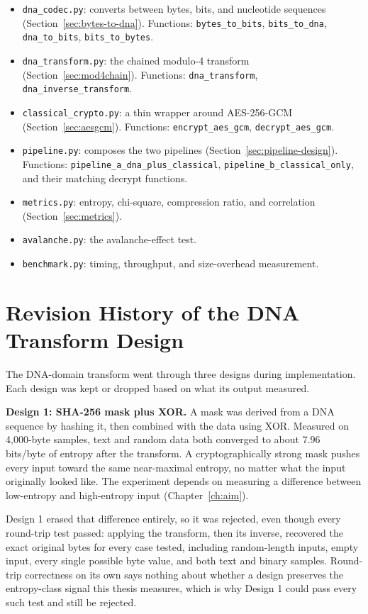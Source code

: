 \documentclass[12pt,a4paper,twoside]{report}
\numberwithin{equation}{chapter}
\begin{document}
\begin{itemize}
\item \texttt{dna\_codec.py}: converts between bytes, bits, and
nucleotide sequences (Section~\ref{sec:bytes-to-dna}). Functions:
\texttt{bytes\_to\_bits}, \texttt{bits\_to\_dna}, \texttt{dna\_to\_bits},
\texttt{bits\_to\_bytes}.
\item \texttt{dna\_transform.py}: the chained modulo-4 transform
(Section~\ref{sec:mod4chain}). Functions: \texttt{dna\_transform},
\texttt{dna\_inverse\_transform}.
\item \texttt{classical\_crypto.py}: a thin wrapper around AES-256-GCM
(Section~\ref{sec:aesgcm}). Functions: \texttt{encrypt\_aes\_gcm},
\texttt{decrypt\_aes\_gcm}.
\item \texttt{pipeline.py}: composes the two pipelines
(Section~\ref{sec:pipeline-design}). Functions:
\texttt{pipeline\_a\_dna\_\allowbreak plus\_classical},
\texttt{pipeline\_b\_classical\_only}, and their matching decrypt
functions.
\item \texttt{metrics.py}: entropy, chi-square, compression ratio, and
correlation (Section~\ref{sec:metrics}).
\item \texttt{avalanche.py}: the avalanche-effect test.
\item \texttt{benchmark.py}: timing, throughput, and size-overhead
measurement.
\end{itemize}

\section{Revision History of the DNA Transform Design}
\label{sec:revision-history}
The DNA-domain transform went through three designs during implementation. Each design was kept or dropped based on what its output measured.

\textbf{Design 1: SHA-256 mask plus XOR.} A mask was derived from a DNA
sequence by hashing it, then combined with the data using XOR. Measured
on 4,000-byte samples, text and random data both converged to about
7.96 bits/byte of entropy after the transform. A cryptographically strong mask pushes every input toward the
same near-maximal entropy, no matter what the input originally looked
like. The experiment depends on measuring a difference between low-entropy and high-entropy input (Chapter~\ref{ch:aim}).

Design 1
erased that difference entirely, so it was rejected, even though every
round-trip test passed: applying the transform, then its inverse,
recovered the exact original bytes for every case tested, including
random-length inputs, empty input, every single possible byte value,
and both text and binary samples. Round-trip correctness on its own
says nothing about whether a design preserves the entropy-class
signal this thesis measures, which is why Design 1 could pass every
such test and still be rejected.
\end{document}

